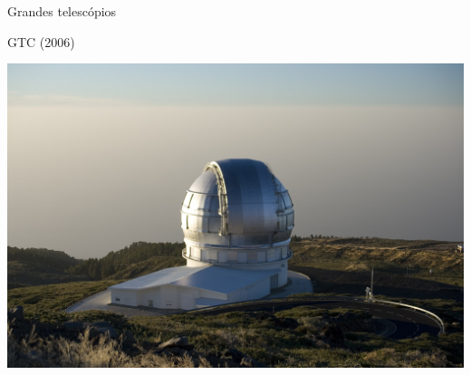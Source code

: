 \documentclass[beamer,9pt,aspectratio=169]{beamer}
\begin{document}
\begin{frame}{Grandes telescópios}
  \begin{minipage}[t]{0.29\linewidth}
    \begin{center}
      GTC (2006)

      \includegraphics[width=0.9\linewidth]{figs/t2_gtc.jpg}


\end{center}
\end{minipage}
\end{frame}
\end{document}
